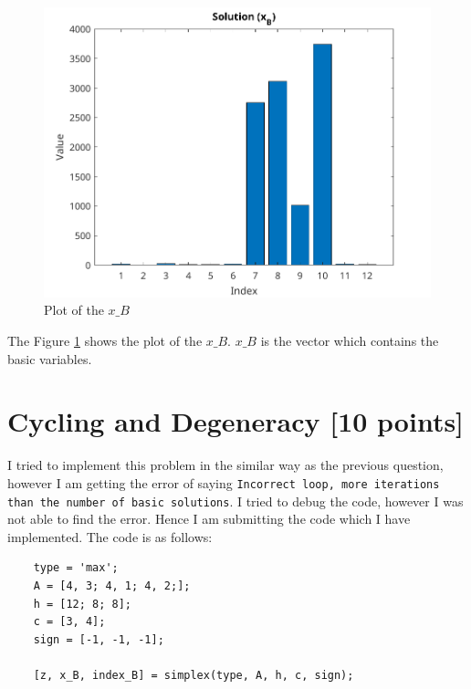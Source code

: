 \documentclass[unicode,11pt,a4paper,oneside,numbers=endperiod,openany]{scrartcl}
\begin{document}
\begin{figure}[H]
	\centering
	\includegraphics[width=0.5\linewidth]{figures/problem_2.png}
	\caption{Plot of the $x\_B$}
	\label{fig:problem_2}
\end{figure}

The Figure \ref{fig:problem_2} shows the plot of the $x\_B$. $x\_B$ is the vector which contains the basic variables.


\section{Cycling and Degeneracy [10 points]}
I tried to implement this problem in the similar way as the previous question, however I am getting the error of saying \texttt{Incorrect loop, more iterations than the number of basic solutions}. I tried to debug the code, however I was not able to find the error. Hence I am submitting the code which I have implemented. The code is as follows:

\begin{lstlisting}
	type = 'max';
	A = [4, 3; 4, 1; 4, 2;];
	h = [12; 8; 8];
	c = [3, 4];
	sign = [-1, -1, -1];

	[z, x_B, index_B] = simplex(type, A, h, c, sign);
\end{lstlisting}
\end{document}
